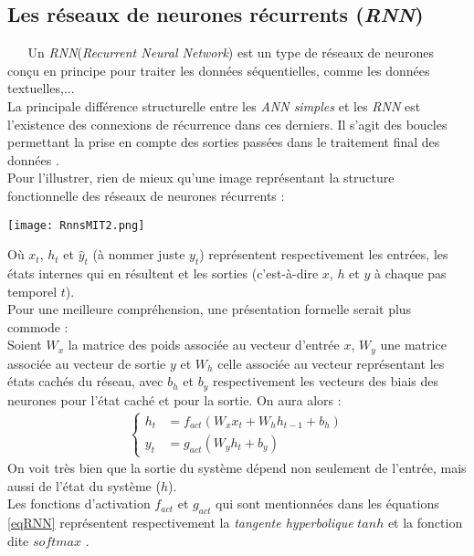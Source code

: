 \subsection{Les réseaux de neurones récurrents (\textit{RNN})}
$ _{} $ $ _{} $ $ _{} $ $ _{} $ $ _{} $Un \textit{RNN}(\textit{Recurrent Neural Network}) est un type de réseaux de neurones conçu en principe pour traiter les données séquentielles, comme les données textuelles,...\\
La principale différence structurelle entre les \textit{ANN simples} et les \textit{RNN} est l'existence des connexions de récurrence dans ces derniers. Il s'agit des boucles permettant la prise en compte des sorties passées dans le traitement final des données \cite{geron2020deep}.\\
Pour l'illustrer, rien de mieux qu'une image représentant la structure fonctionnelle des réseaux de neurones récurrents :\newpage
\begin{center}
\texttt{[image: RnnsMIT2.png]}
\label{IllustRNN}
\end{center}
Où $ x_{t} $, $ h_{t} $ et $ \hat{y}_{t} $ (à nommer juste $ y_{t} $) représentent respectivement les entrées, les états internes qui en résultent et les sorties (c'est-à-dire $ x $, $ h $ et $ y $ à chaque pas temporel $ t $).\\
Pour une meilleure compréhension, une présentation formelle serait plus commode :\\
Soient $ W_{x} $ la matrice des poids associée au vecteur d'entrée $ x $, $ W_{y} $ une matrice associée au vecteur de sortie $ y $ et $ W_{h} $ celle associée au vecteur représentant les états cachés du réseau, avec $ b_{h} $ et $ b_{y} $ respectivement les vecteurs des biais des neurones pour l'état caché et pour la sortie. On aura alors \cite{ganegedara2018natural} :
\begin{eqnarray}\label{eqRNN}
\begin{cases}
h_{t} &= f_{act}\left( W_{x}x_{t}+W_{h}h_{t-1}+ b_{h} \right)\\
y_{t} &= g_{act}\left( W_{y}h_{t} + b_{y} \right)
\end{cases}
\end{eqnarray}
On voit très bien que la sortie du système dépend non seulement de l'entrée, mais aussi de l'état du système ($ h $).\\
Les fonctions d'activation $ f_{act} $ et $ g_{act} $ qui sont mentionnées dans les équations \ref{eqRNN} représentent respectivement la \textit{tangente hyperbolique} $ tanh $ et la fonction dite $ softmax $ \cite{ganegedara2018natural}.

